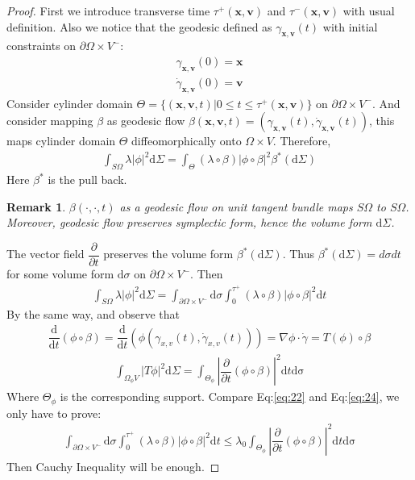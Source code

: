 \documentclass[12pt,a4paper]{article}
\newtheorem{proof}{Proof}[subsection]
\newtheorem{remark}{Remark}[subsection]
\begin{document}
\begin{proof}
First we introduce transverse time $\tau^{+}(\mathbf{x},\mathbf{v})$ and $\tau^{-}(\mathbf{x},\mathbf{v})$ with usual definition. Also we notice that the geodesic defined as $\gamma_{\mathbf{x},\mathbf{v}}(t)$ with initial constraints on $\partial\Omega\times V^{-}$:
\begin{eqnarray}
\gamma_{\mathbf{x},\mathbf{v}}(0) = \mathbf{x}\\
\dot{\gamma}_{\mathbf{x},\mathbf{v}}(0) = \mathbf{v}
\end{eqnarray}
Consider cylinder domain $\Theta = \{(\mathbf{x},\mathbf{v},t) | 0\le t\le \tau^{+}(\mathbf{x},\mathbf{v})\}$ on $\partial\Omega\times V^{-}$. And consider mapping $\beta$ as geodesic flow $\beta(\mathbf{x},\mathbf{v},t) = (\gamma_{\mathbf{x},\mathbf{v}}(t), \dot{\gamma}_{\mathbf{x},\mathbf{v}}(t))$, this maps cylinder domain $\Theta$ diffeomorphically onto $\Omega\times V$. Therefore, 
\begin{eqnarray}
\int_{S\Omega}\lambda |\phi|^2 \mathrm{d}\Sigma = \int_{\Theta}(\lambda\circ\beta) |\phi\circ\beta|^2\beta^{\ast}(\mathrm{d}\Sigma)
\end{eqnarray}
Here $\beta^{\ast}$ is the pull back. 
\begin{remark}
$\beta(\cdot,\cdot,t)$ as a geodesic flow on unit tangent bundle maps $S\Omega$ to $S\Omega$. Moreover, geodesic flow preserves symplectic form, hence the volume form $\mathrm{d}\Sigma$.
\end{remark}
The vector field $\dfrac{\partial}{\partial t}$ preserves the volume form $\beta^{\ast}(\mathrm{d}\Sigma)$. Thus $\beta^{\ast}(\mathrm{d}\Sigma) = d\sigma dt$ for some volume form $\mathrm{d}\sigma$ on $\partial \Omega\times V^{-}$. Then
\begin{eqnarray}\label{eq:22}
\int_{S\Omega}\lambda |\phi|^2 \mathrm{d}\Sigma = \int_{\partial\Omega\times V^{-}}\mathrm{d}\sigma\int_{0}^{\tau^{+}}(\lambda\circ\beta) |\phi\circ\beta|^2\mathrm{d}t
\end{eqnarray}
By the same way, and observe that
\begin{eqnarray}
\dfrac{\mathrm{d}}{\mathrm{d}t}(\phi\circ\beta) = \dfrac{\mathrm{d}}{\mathrm{d}t}(\phi(\gamma_{x,v}(t), \dot{\gamma}_{x,v}(t))) = \nabla \phi \cdot \dot{\gamma}=T(\phi)\circ\beta
\end{eqnarray}
\begin{eqnarray}\label{eq:24}
\int_{\Omega_{\phi} V}|T\phi|^2\mathrm{d}\Sigma =\int_{\Theta_{\phi}}|\dfrac{\partial}{\partial t}(\phi\circ \beta)|^2 \mathrm{d}t\mathrm{d\sigma}
\end{eqnarray}
Where $\Theta_{\phi}$ is the corresponding support. Compare Eq:\ref{eq:22} and Eq:\ref{eq:24}, we only have to prove:
\begin{eqnarray}
\int_{\partial\Omega\times V^{-}}\mathrm{d}\sigma\int_{0}^{\tau^{+}}(\lambda\circ\beta) |\phi\circ\beta|^2\mathrm{d}t\le\lambda_0 \int_{\Theta_{\phi}}|\dfrac{\partial}{\partial t}(\phi\circ \beta)|^2 \mathrm{d}t\mathrm{d\sigma}
\end{eqnarray}
Then Cauchy Inequality will be enough.
\end{proof}
\end{document}
